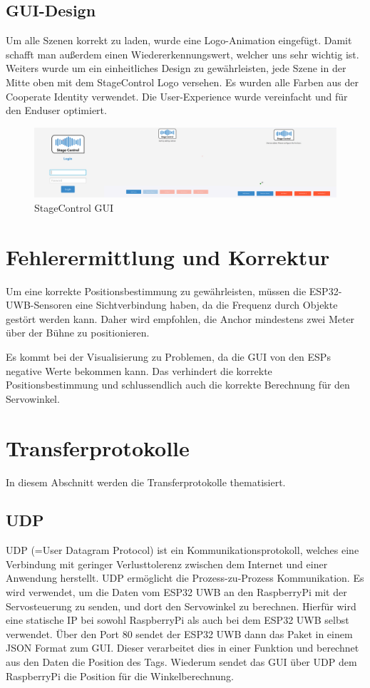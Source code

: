 \newpage
\subsection{GUI-Design}
Um alle Szenen korrekt zu laden, wurde eine Logo-Animation eingefügt. Damit schafft man außerdem einen Wiedererkennungswert, welcher uns sehr wichtig ist. Weiters wurde um ein einheitliches Design zu gewährleisten, jede Szene in der Mitte oben mit dem StageControl Logo versehen. Es wurden alle Farben aus der Cooperate Identity verwendet. Die User-Experience wurde vereinfacht und für den Enduser optimiert.   

\begin{figure}[H]
	\centering
	\includegraphics[width=0.9\linewidth]{images/stagecontrol.png}
	\caption[StageControl GUI]{StageControl GUI}
	\label{fig:StageControlGUI}
\end{figure}

\section{Fehlerermittlung und Korrektur}
Um eine korrekte Positionsbestimmung zu gewährleisten, müssen die ESP32-UWB-Sensoren eine Sichtverbindung haben, da die Frequenz durch Objekte gestört werden kann. Daher wird empfohlen, die Anchor mindestens zwei Meter über der Bühne zu positionieren.

 Es kommt bei der Visualisierung zu Problemen, da die GUI von den ESPs negative Werte bekommen kann. Das verhindert die korrekte Positionsbestimmung und schlussendlich auch die korrekte Berechnung für den Servowinkel. 

\section{Transferprotokolle}
In diesem Abschnitt werden die Transferprotokolle thematisiert.

\subsection{UDP}
UDP (=User Datagram Protocol) ist ein Kommunikationsprotokoll, welches eine Verbindung mit geringer Verlusttolerenz zwischen dem Internet und einer Anwendung herstellt. UDP ermöglicht die Prozess-zu-Prozess Kommunikation. Es wird verwendet, um die Daten vom ESP32 UWB an den RaspberryPi mit der Servosteuerung zu senden, und dort den Servowinkel zu berechnen. Hierfür wird eine statische IP bei sowohl RaspberryPi als auch bei dem ESP32 UWB selbst verwendet. Über den Port 80 sendet der ESP32 UWB dann das Paket in einem JSON Format zum GUI. Dieser verarbeitet dies in einer Funktion und berechnet aus den Daten die Position des Tags. Wiederum sendet das GUI über UDP dem RaspberryPi die Position für die Winkelberechnung. \parencite{UDP}

